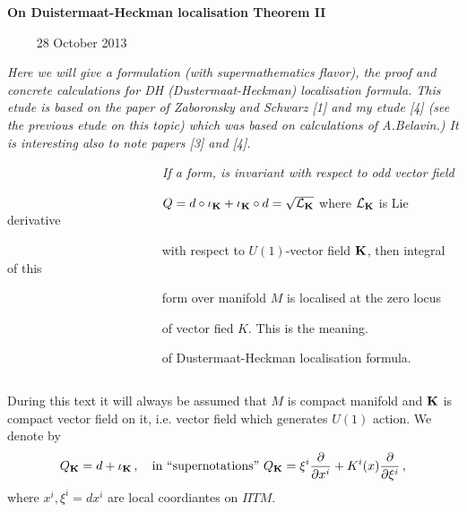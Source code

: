 
\def\vare {\varepsilon}
\def\A {{\bf A}}
\def\FF {{\bf F}}
\def\a {\alpha}
\def\K {{\bf K}}
\def\s {{\sigma}}
\def\p{\partial}
\def\vare{{\varepsilon}}
\def\L {{\cal L}}
\def\G {{\Gamma}}
\def\C {{\bf C}}
\def\Z {{\bf Z}}
\def\U  {{\cal U}}
\def\R  {{\bf R}}
\def\E  {{\bf E}}
\def\l {\lambda}
\def\degree {{\bf {\rm degree}\,\,}}
\def \finish {${\,\,\vrule height1mm depth2mm width 8pt}$}
\def \m {\medskip}
\def\r {{\bf r}}
\def\v {{\bf v}}
\def\n {{\bf n}}
\def\b {{\bf b}}
\def\ss  {{\bf s }}
\def\e{{\bf e}}
\def\ac {{\bf a}}
\def \X   {{\bf X}}
\def \Y   {{\bf Y}}
\def \x   {{\bf x}}
\def \y   {{\bf y}}
\def\w {{\omega}} 
\def\wv {{\buildrel \rightarrow\over \omega}}

\def\K{{\bf K}}
\def\locus {\hbox{locus of $\K$}}


\centerline {\bf On Duistermaat-Heckman localisation Theorem II}

  \bigskip

$\qquad$ 28 October 2013

\m

{\it
   Here we will give a formulation (with supermathematics flavor),
the proof and concrete calculations
for DH (Dustermaat-Heckman) localisation formula. This etude is based
on the paper of  Zaboronsky and Schwarz [1] and my etude
[4] (see the previous etude on this topic) which was based on calculations 
of A.Belavin.) It is interesting also to note papers [3] and [4].
}

      \medskip
{\sl
  $\qquad\qquad$$\qquad\qquad$$\qquad\qquad$ If a form, 
  is invariant with respect to odd vector field


$\qquad\qquad$$\qquad\qquad$$\qquad\qquad$  
  $Q=d\circ \iota_\K+\iota_\K\circ d=\sqrt {\L_\K}$ 
   where $\L_\K$ is Lie derivative 

$\qquad\qquad$$\qquad\qquad$$\qquad\qquad$ with respect
 to $U(1)$-vector field $\K$, then integral of this 

$\qquad\qquad$$\qquad\qquad$$\qquad\qquad$ form over manifold
  $M$ is localised at the zero locus 

$\qquad\qquad$$\qquad\qquad$$\qquad\qquad$ of vector fied $K$. This is the
 meaning.

$\qquad\qquad$$\qquad\qquad$$\qquad\qquad$ 
of Dustermaat-Heckman localisation formula.

}
 $$ $$

   During this text it will always be assumed that
$M$ is compact manifold  and $\K$ is compact vector field on it, 
i.e. vector field which generates $U(1)$
action. We denote by $$
   Q_\K=d+\iota_\K\,,\quad \hbox
 {in ``supernotations''}\,\,
Q_\K=\xi^i{\p\over \p x^i}+K^i(x){\p \over \p \xi^i}\,,
              $$
where $x^i,\xi^i=dx^i$ are local coordiantes on $\Pi TM$.

